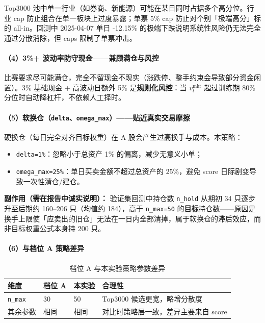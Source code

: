 \documentclass[UTF8,a4paper,12pt]{ctexart}
\begin{document}
Top3000 池中单一行业（如券商、新能源）可能在某日同时占据多个高分位。行业 cap 防止组合在单一板块上过度暴露；单票 5\% cap 防止对个别「极端高分」标的 all-in。回测中 2025-04-07 单日 -12.15\% 的极端下跌说明系统性风险仍无法完全通过分散消除，但 caps 限制了单票冲击。

\paragraph{（4）3\%+ 波动率防守现金——兼顾满仓与风控}

比赛要求尽可能满仓，完全不留现金不现实（涨跌停、整手约束会导致部分资金闲置）。3\% 基础现金 + 高波动日额外 5\% 是\textbf{规则化风控}：当 $v^{\mathrm{mkt}}_t$ 超过训练期 80\% 分位时自动降杠杆，不依赖人工择时。

\paragraph{（5）软换仓（\texttt{delta}、\texttt{omega\_max}）——贴近真实交易摩擦}

硬换仓（每日完全对齐目标权重）在 A 股会产生过高换手与成本。本策略：
\begin{itemize}[leftmargin=2em]
  \item \texttt{delta=1\%}：忽略小于总资产 1\% 的偏离，减少无意义小单；
  \item \texttt{omega\_max=25\%}：单日买卖金额不超过总资产的 25\%，避免 score 日际剧变导致一次性清仓/建仓。
\end{itemize}
\textbf{副作用（需在报告中诚实说明）：} 验证集回测中持仓数 \texttt{n\_hold} 从期初 34 只逐步升至后期约 160--206 只（均值约 184），高于 \texttt{n\_max=50} 的\textbf{目标}持仓数——原因是换手上限使「应卖出的旧仓」无法在一日内全部清掉，属于软换仓的滞后效应，而非目标权重公式本身持 200 只。

\paragraph{（6）与档位 A 策略差异}

\begin{table}[H]
\centering
\caption{档位 A 与本实验策略参数差异}
\label{tab:strategy-vs-a}
\small
\begin{tabular}{lllp{4.5cm}}
\toprule
\textbf{维度} & \textbf{档位 A} & \textbf{本实验} & \textbf{合理性} \\
\midrule
\texttt{n\_max} & 30 & 50 & Top3000 候选更宽，略增分散度 \\
其余参数 & 相同 & 相同 & 对比时策略层一致，差异主要来自 score \\
\bottomrule
\end{tabular}
\end{table}
\end{document}

